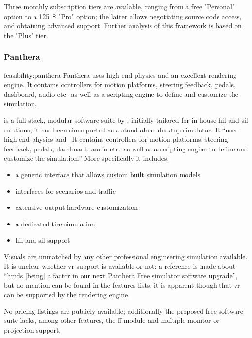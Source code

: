 Three monthly subscription tiers are available, ranging from a free "Personal" option to a \SI{125}{\$} "Pro" option; the latter allows negotiating source code access, and obtaining advanced support. Further analysis of this \gls{framework} is based on the "Plus" tier.

\subsubsection{Panthera}

\begin{excerpt}{feasibility:panthera}
	Panthera uses high-end physics and an excellent rendering engine. It contains controllers for motion platforms, steering feedback, pedals, dashboard, audio etc.\ as well as a scripting engine to define and customize the simulation.
\end{excerpt}

 is a full-stack, modular software suite by ; initially tailored for in-house \gls{hil} and \gls{sil} solutions, it has been since ported as a stand-alone desktop simulator. It \enquote{uses high-end physics and \CHARomissis\ It contains controllers for motion platforms, steering feedback, pedals, dashboard, audio etc.\ as well as a scripting engine to define and customize the simulation.}{\cite{feasibility:panthera}} More specifically it includes:

\begin{itemize}
	\item a generic interface that allows custom built simulation models
    \item interfaces for scenarios and traffic
    \item extensive output hardware customization
    \item a dedicated tire simulation
    \item \gls{hil} and \gls{sil} support
\end{itemize}

Visuals are unmatched by any other professional engineering simulation available. It is unclear whether \gls{vr} support is available or not: a reference is made about \enquote{\glspl{hmd} [being] a factor in our next Panthera Free simulator software upgrade}{\cite{feasibility:pantheravr}}, but no mention can be found in the features lists; it is apparent though that \gls{vr} can be supported by the rendering engine.

No pricing listings are publicly available; additionally the proposed free software suite lacks, among other features, the \gls{ff} module and multiple monitor or projection support.

